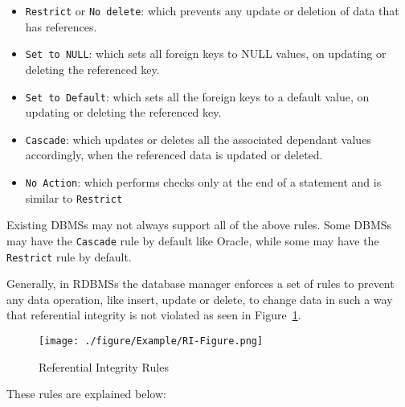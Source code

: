 	\begin{itemize}
	
		\item \texttt{Restrict} or \texttt{No delete}: which prevents any update or
		deletion of data that has references. 
		
		\item \texttt{Set to NULL}: which sets all foreign keys to NULL values,   on
		updating or deleting the referenced key. 
		
		\item \texttt{Set to Default}: which sets all the foreign
		keys to a default value,   on updating or deleting the referenced key. 
		
		\item \texttt{Cascade}: which updates or deletes all the
		associated dependant values accordingly,   when the referenced data is updated or
		deleted. 
		
		\item \texttt{No Action}: which performs checks only at the end of a
		statement and is similar to \texttt{Restrict}
		
	\end{itemize}

Existing \acp{DBMS} may not always support all of the above rules.  Some \acp{DBMS} may
have the \texttt{Cascade} rule by default like Oracle,   while some may have the
\texttt{Restrict} rule by default.  

Generally,   in \acp{RDBMS} the database manager enforces a set of rules to
prevent any data operation,   like insert,   update or delete,   to change data
in such a way that referential integrity is not violated as seen in
Figure~\ref{f:RI}. 

	\begin{figure}[H]
		\centering
		\texttt{[image: ./figure/Example/RI-Figure.png]}
		\caption{Referential Integrity Rules}\label{f:RI}
	\end{figure}

These rules are explained below:

